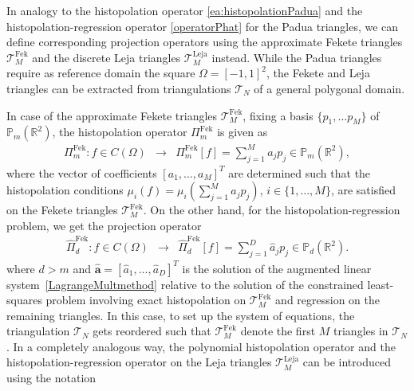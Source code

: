 \documentclass{svjour3}
\newcommand{\T}{\mathcal{T}}
\begin{document}
In analogy to the histopolation operator \eqref{ea:histopolationPadua} and the histopolation-regression operator \eqref{operatorPhat} for the Padua triangles, we can define corresponding projection operators using the approximate Fekete triangles $\T^{\mathrm{Fek}}_{M}$ and the discrete Leja triangles $\T^{\mathrm{Leja}}_{M}$ instead. While the Padua triangles require as reference domain the square $\Omega = [-1,1]^2$, the Fekete and Leja triangles can be extracted from triangulations $\T_N$ of a general polygonal domain. 

In case of the approximate Fekete triangles $\mathcal{T}_M^{\mathrm{Fek}}$, fixing a basis $\{p_1, \ldots p_M\}$ of $\mathbb{P}_m\left(\mathbb{R}^2\right)$, the histopolation operator ${\Pi}^{\mathrm{Fek}}_{m}$ is given as 
\begin{equation*}\label{operatorinterpFek}
\begin{array}{rcl}
{\Pi}^{\mathrm{Fek}}_{m}: f \in C\left(\Omega\right) &\rightarrow& {\Pi}^{\mathrm{Fek}}_{m}[f] =\sum\limits_{j=1}^{M}a_j p_j\in \mathbb{P}_m\left(\mathbb{R}^2\right),
\end{array}
\end{equation*}
where the vector of coefficients $\left[a_1,\dots,a_{M}\right]^T$ are determined such that the histopolation conditions $\mu_i(f) = \mu_i\left(\sum_{j=1}^{M}a_j p_j \right)$, $i \in \{1, \ldots, M\}$, are satisfied on the Fekete triangles $\mathcal{T}_M^{\mathrm{Fek}}$. On the other hand, for the histopolation-regression problem, we get the projection operator
\begin{equation}\label{operatorPhatFek}
\begin{array}{rcl}
\hat{\Pi}^{\mathrm{Fek}}_{d}: f \in C\left(\Omega\right) &\rightarrow& \hat{\Pi}^{\mathrm{Fek}}_{d}[f] = \sum\limits_{j=1}^{D}\hat{a}_j p_j \in \mathbb{P}_d\left(\mathbb{R}^2\right). 
\end{array}
\end{equation}
where $d > m$ and $\hat{\boldsymbol{a}}=\left[\hat{a}_1,\dots,\hat{a}_{D}\right]^T$ is the solution of the augmented linear system~\eqref{LagrangeMultmethod} relative to the solution of the constrained least-squares problem involving exact histopolation on $\mathcal{T}_M^{\mathrm{Fek}}$ and regression on the remaining triangles. In this case, to set up the system of equations, the triangulation $\T_N$ gets reordered such that $\mathcal{T}_M^{\mathrm{Fek}}$ denote the first $M$ triangles in $\T_N$. 
 In a completely analogous way, the polynomial histopolation operator and the histopolation-regression operator on the Leja triangles $\mathcal{T}_M^{\mathrm{Leja}}$ can be introduced using the notation
\end{document}
